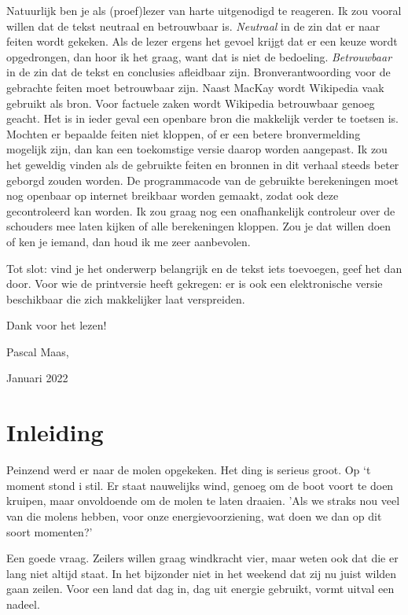 \documentclass[
  11pt,
  a4paper,
]{book}
\begin{document}
Natuurlijk ben je als (proef)lezer van harte uitgenodigd te reageren. Ik zou vooral willen dat de tekst neutraal en betrouwbaar is. \emph{Neutraal} in de zin dat er naar feiten wordt gekeken. Als de lezer ergens het gevoel krijgt dat er een keuze wordt opgedrongen, dan hoor ik het graag, want dat is niet de bedoeling. \emph{Betrouwbaar} in de zin dat de tekst en conclusies afleidbaar zijn. Bronverantwoording voor de gebrachte feiten moet betrouwbaar zijn. Naast MacKay wordt Wikipedia vaak gebruikt als bron. Voor factuele zaken wordt Wikipedia betrouwbaar genoeg geacht. Het is in ieder geval een openbare bron die makkelijk verder te toetsen is. Mochten er bepaalde feiten niet kloppen, of er een betere bronvermelding mogelijk zijn, dan kan een toekomstige versie daarop worden aangepast. Ik zou het geweldig vinden als de gebruikte feiten en bronnen in dit verhaal steeds beter geborgd zouden worden. De programmacode van de gebruikte berekeningen moet nog openbaar op internet breikbaar worden gemaakt, zodat ook deze gecontroleerd kan worden. Ik zou graag nog een onafhankelijk controleur over de schouders mee laten kijken of alle berekeningen kloppen. Zou je dat willen doen of ken je iemand, dan houd ik me zeer aanbevolen.

Tot slot: vind je het onderwerp belangrijk en de tekst iets toevoegen, geef het dan door. Voor wie de printversie heeft gekregen: er is ook een elektronische versie beschikbaar die zich makkelijker laat verspreiden.

\bigskip

\noindent
Dank voor het lezen!

\bigskip

\noindent
Pascal Maas,

\noindent
Januari 2022

\hypertarget{inleiding}{%
\chapter*{Inleiding}\label{inleiding}}

Peinzend werd er naar de molen opgekeken. Het ding is serieus groot. Op `t moment stond i stil. Er staat nauwelijks wind, genoeg om de boot voort te doen kruipen, maar onvoldoende om de molen te laten draaien. 'Als we straks nou veel van die molens hebben, voor onze energievoorziening, wat doen we dan op dit soort momenten?'

Een goede vraag. Zeilers willen graag windkracht vier, maar weten ook dat die er lang niet altijd staat. In het bijzonder niet in het weekend dat zij nu juist wilden gaan zeilen. Voor een land dat dag in, dag uit energie gebruikt, vormt uitval een nadeel.
\end{document}
